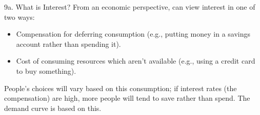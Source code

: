 \begin{CHPT_SUMM_AUTO}[label = {L.-9a}]{9a. What is Interest?}
From an economic perspective, can view interest in one of two ways:
\begin{itemize}
	\item	Compensation for deferring consumption (e.g., putting money in a savings account rather than spending it).
	\item	Cost of consuming resources which aren't available (e.g., using a credit card to buy something).
\end{itemize}
People's choices will vary based on this consumption; if interest rates (the compensation) are high, more people will tend to save rather than spend. The demand curve is based on this.

\end{CHPT_SUMM_AUTO}

